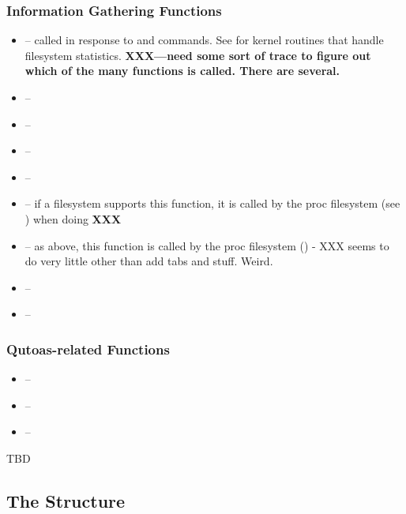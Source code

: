 
\subsubsection{Information Gathering Functions}

\begin{itemize}    
    \item {} -- called in response to and  commands. See  for kernel routines
    	that handle filesystem statistics. \textbf{XXX---need some sort of trace to figure out which of the many functions
	is called. There are several.}    \item {} --
    \item {} --
    \item {} --
    \item {} --
    \item {} -- if a filesystem supports this function, it is called by the proc filesystem (see )
    	when doing \textbf{XXX}
    \item {} -- as above, this function is called by the proc filesystem () - XXX seems
    	to do very little other than add tabs and stuff. Weird.
    \item {} --
    \item {} --
\end{itemize}


\subsubsection{Qutoas-related Functions}
    
\begin{itemize}
    \item {} --
    \item {} --
    \item {} --
\end{itemize}

\noindent
TBD


\subsection{The  Structure}

